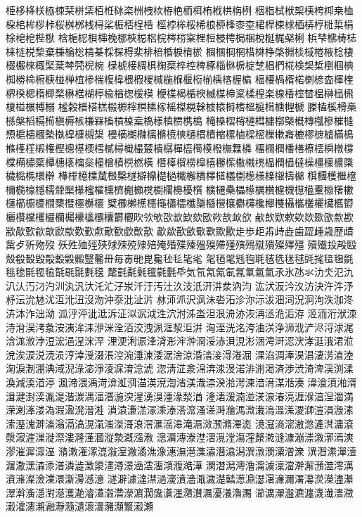 栕栘栙栚栛栜栞栟栠栢栣栤栥栦栧栨栫栬栭栮栯栰栱栴栵
栶栺栻栿桇桋桍桏桒桖桗桘桙桚桛桜桝桞桟桪桬桭桮桯桰
桱桲桳桵桸桹桺桻桼桽桾桿梀梂梄梇梈梉梊梋梌梍梎梐梑
梒梔梕梖梙梚梛梜梞梠梡梣梤梥梩梪梫梬梮梱梲梴梶梷梸
梹梺梻梼梽梾梿棁棃棄棅棆棇棈棊棌棎棏棐棑棓棔棙棛棜
棝棞棡棢棤棥棦棨棩棪棫棬棭棯棲棳棴棶棷棸棻棽棾棿椀
椂椃椄椆椇椈椉椊椌椑椓椔椕椖椗椘椙椚椛検椝椞椡椢椣
椥椦椧椨椩椪椫椬椮椯椱椲椳椵椶椷椸椺椻椼椾楀楁楃楄
楅楆楇楈楉楋楌楍楎楏楐楑楒楕楖楘楙楛楜楟楡楢楤楥楧
楩楪楬楯楰楲楳楴楶楺楻楽楾楿榁榃榅榊榋榌榎榏榐榑榒
榓榖榗榙榚榝榞榟榠榡榢榣榤榥榦榩榬榯榰榲榳榵榶榸榹
榺榼榽榾槀槂槃槄槅槆槇槈槉槏槑槒槓槕槖槗様槙槚槜槝
槞槡槢槣槤槥槦槨槩槪槫槬槮槯槰槱槴槵槶槷槸槹槺槻槼
槾樀樃樄樆樇樈樉樋樌樍樎樏樐樑樒樔樕樖樚樛樜樝樠樢
樤樥樦樧権樫樬樭樮樰樲樳樴樶樷樻樼樿橀橁橂橃橅橆橉
橊橌橍橎橏橑橒橓橔橕橖橗橚橜橝橞橠橣橤橦橧橨橩橪橫
橬橭橮橯橰橲橳橴橵橶橷橸橺橻橽橾橿檁檂檃檅檆檇檈檊
檋檌檍檏檒檓檕檖檘檙檚檛檝檞檟檡檤檥檦檧檨檪檭檮檰
檱檲檴檵檶檷檹檺檼檽檾檿櫀櫁櫂櫄櫅櫆櫇櫈櫉櫊櫋櫌櫍
櫎櫏櫐櫑櫒櫔櫕櫖櫗櫘櫙櫜櫠櫡櫢櫣櫤櫥櫦櫩櫫櫭櫮櫯櫰
櫱櫲櫴櫵櫶櫷櫹櫺櫼櫽櫾櫿欀欁欂欃欅欆欇欈欉欋欌欍欎
欐欑欓欔欕欗欘欙欚欛欜欝欟欥欦欨欩欪欫欬欭欮欯欰欱
欳欴欵欶欸欻欼欿歀歁歂歄歅歈歊歋歍歎歏歑歒歓歔歕歖
歗歘歚歛歜歝歞歠歨歩歫歬歭歮歯歰歱歳歴歵歶歺歽歾歿
殀殅殈殌殎殏殐殑殔殕殗殙殜殝殟殠殢殣殥殦殧殨殩殬殭
殰殱殶殸殹殼殽殾毀毃毄毇毈毉毊毌毎毐毑毘毚毜毝毞毟
毠毢毣毤毥毦毧毨毩毬毭毮毰毱毲毴毶毷毸毺毻毼毾氀氁
氂氃氄氉氊氋氎氒気氜氝氞氠氥氭氱氳氶氷氹氺氻氼氾氿
汃汄汅汈汋汌汍汎汏汑汒汓汖汘汙汚汢汣汥汦汧汫汬汭汮
汯汱汳汵汷汸決汻汼汿沀沄沇沊沋沍沎沑沒沕沖沗沘沚沜
沝沞沠沢沨沬沯沰沴沵沶沷沺泀況泂泃泆泇泈泋泍泎泏泑
泒泘泙泚泜泝泟泤泦泧泩泬泭泲泴泹泿洀洂洃洅洆洈洉洊
洍洏洐洑洓洔洕洖洘洜洝洟洠洡洢洣洤洦洨洩洬洭洯洰洴
洶洷洸洺洿浀浂浄浉浌浐浕浖浗浘浛浝浟浡浢浤浥浧浨浫
浬浭浰浱浲浳浵浶浺浻浽浾浿涀涁涃涄涆涊涋涍涏涐涒涖
涗涘涙涚涜涢涥涬涭涰涱涳涴涶涷涹涺涻涼涽涾淁淂淃淈
淉淊淍淎淏淐淒淓淔淕淗淚淛淜淟淢淣淥淧淨淩淭淯淰淲
淴淸淽淾淿渀渁渂渃渄渆渇済渉渋渏渒渓渕渘渙減渜渞渟
渢渧渨渪渮渰渱渳渵渶渷渹渻渼渽渿湀湁湂湅湆湇湈湉湊
湋湌湏湐湑湒湕湗湙湚湜湝湠湡湢湣湤湥湦湧湨湩湪湬湭
湰湱湲湳湴湵湶湷湸湹湺湻湼湽満溁溂溄溇溈溊溋溌溍溎
溑溒溓溔溕溗溙溚溛溞溠溡溣溤溦溨溩溫溬溭溮溰溳溵溸
溹溼溾溿滀滃滆滈滉滊滍滐滒滖滘滙滛滜滝滣滧滪滫滭滮
滰滱滳滵滶滺滻滼滽滾漀漃漄漅漇漈漊漋漌漍漎漐漑漒漖
漗漘漙漛漜漝漞漟漡漥漦漧漨漮漰漴漵漷漹漺漻漼漽潀潂
潃潄潅潈潉潊潌潎潏潐潒潓潕潖潗潚潛潝潟潠潡潣潥潧潨
潩潪潫潬潱潳潵潶潹潻潽潾澁澂澃澅澊澋澏澐澑澒澓澔澕
澖澘澙澚澛澝澞澟澢澣澥澦澨澪澫澬澭澯澰澲澴澵澷澸澺
澻澼澽澾澿濄濅濆濇濈濊濋濌濍濎濏濐濓濔濖濗濙濚濜濝
濢濣濥濦濧濨濩濪濬濭濲濳濴濵濶濷濸濹濻濽濿瀀瀁瀂瀃
瀄瀇瀈瀊瀌瀍瀎瀐瀒瀓瀔瀖瀗瀙瀜瀞瀡瀢瀤瀥瀦瀩瀪瀫瀬
